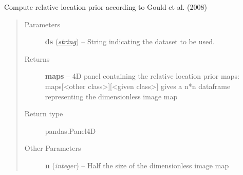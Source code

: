 \documentclass[letterpaper,10pt,english]{sphinxmanual}
\begin{document}
\begin{fulllineitems}
\label{flamingo/classification/index:flamingo.classification.features.relativelocation.compute_prior}
Compute relative location prior according to Gould et al. (2008)
\begin{quote}\begin{description}
\item[{Parameters}] \leavevmode
\textbf{ds} (\href{http://docs.python.org/library/string.html\#module-string}{\emph{string}}) -- String indicating the dataset to be used.

\item[{Returns}] \leavevmode
\textbf{maps} --
4D panel containing the relative location prior maps: maps{[}\textless{}other class\textgreater{}{]}{[}\textless{}given class\textgreater{}{]}
gives a n*n dataframe representing the dimensionless image map

\item[{Return type}] \leavevmode
pandas.Panel4D

\item[{Other Parameters}] \leavevmode
\textbf{n} (\emph{integer}) --
Half the size of the dimensionless image map

\end{description}\end{quote}

\end{fulllineitems}

\end{document}
